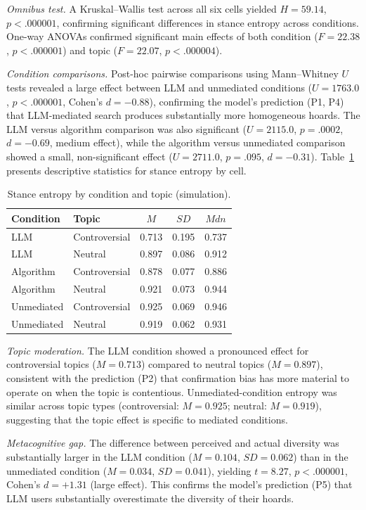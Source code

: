 \documentclass[12pt,a4paper]{article}
\begin{document}
\emph{Omnibus test.}
A Kruskal--Wallis test across all six cells yielded $H = 59.14$, $p < .000001$, confirming significant differences in stance entropy across conditions.
One-way ANOVAs confirmed significant main effects of both condition ($F = 22.38$, $p < .000001$) and topic ($F = 22.07$, $p < .000004$).

\emph{Condition comparisons.}
Post-hoc pairwise comparisons using Mann--Whitney $U$ tests revealed a large effect between LLM and unmediated conditions ($U = 1763.0$, $p < .000001$, Cohen's $d = -0.88$), confirming the model's prediction (P1, P4) that LLM-mediated search produces substantially more homogeneous hoards.
The LLM versus algorithm comparison was also significant ($U = 2115.0$, $p = .0002$, $d = -0.69$, medium effect), while the algorithm versus unmediated comparison showed a small, non-significant effect ($U = 2711.0$, $p = .095$, $d = -0.31$).
Table~\ref{tab:entropy} presents descriptive statistics for stance entropy by cell.

\begin{table}[ht]
\centering
\caption{Stance entropy by condition and topic (simulation).}
\label{tab:entropy}
\begin{tabular}{llccc}
\toprule
Condition   & Topic         & $M$   & $SD$  & $Mdn$ \\
\midrule
LLM         & Controversial & 0.713 & 0.195 & 0.737 \\
LLM         & Neutral       & 0.897 & 0.086 & 0.912 \\
Algorithm   & Controversial & 0.878 & 0.077 & 0.886 \\
Algorithm   & Neutral       & 0.921 & 0.073 & 0.944 \\
Unmediated  & Controversial & 0.925 & 0.069 & 0.946 \\
Unmediated  & Neutral       & 0.919 & 0.062 & 0.931 \\
\bottomrule
\end{tabular}
\end{table}

\emph{Topic moderation.}
The LLM condition showed a pronounced effect for controversial topics ($M = 0.713$) compared to neutral topics ($M = 0.897$), consistent with the prediction (P2) that confirmation bias has more material to operate on when the topic is contentious.
Unmediated-condition entropy was similar across topic types (controversial: $M = 0.925$; neutral: $M = 0.919$), suggesting that the topic effect is specific to mediated conditions.

\emph{Metacognitive gap.}
The difference between perceived and actual diversity was substantially larger in the LLM condition ($M = 0.104$, $SD = 0.062$) than in the unmediated condition ($M = 0.034$, $SD = 0.041$), yielding $t = 8.27$, $p < .000001$, Cohen's $d = +1.31$ (large effect).
This confirms the model's prediction (P5) that LLM users substantially overestimate the diversity of their hoards.
\end{document}
